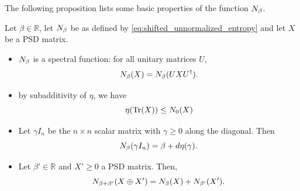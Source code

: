 \documentclass[notitlepage, 10pt]{article}
\begin{document}
The following proposition lists some basic properties of the function $N_{\beta}$.
\begin{prop}
    Let $\beta \in \mathbb R$, let $N_{\beta}$ be as defined by \cref{eq:shifted_unnormalized_entropy} and let $X$ be a PSD matrix.
    \begin{itemize}
        \item $N_{\beta}$ is a spectral function: for all unitary matrices $U$,
            \begin{equation}
                N_{\beta}(X) = N_{\beta}(U X U^{\dagger}).
            \end{equation}
        \item by subadditivity of $\eta$, we have
            \begin{equation}
                \eta(\operatorname{Tr}(X)) \leq N_{0}(X)
            \end{equation}
        \item Let $\gamma I_{n}$ be the $n\times n$ scalar matrix with $\gamma \geq 0$ along the diagonal. Then
            \begin{equation}
                N_{\beta}(\gamma I_{n}) = \beta + d\eta(\gamma).
            \end{equation}
        \item Let $\beta' \in \mathbb R$ and $X' \geq 0$ a PSD matrix. Then,
            \begin{equation}
                N_{\beta + \beta'}(X\oplus X') = N_{\beta}(X) + N_{\beta'}(X').
            \end{equation}
    \end{itemize}
\end{prop}
\end{document}
